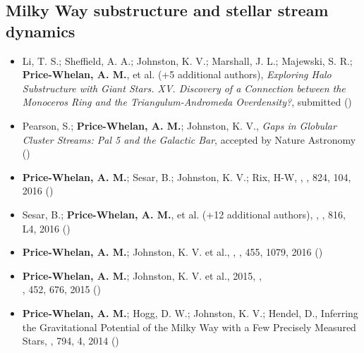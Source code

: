 \documentclass[12pt,letterpaper]{article}
\begin{document}
    \subsection*{Milky Way substructure and stellar stream dynamics}
    \begin{itemize}

\item Li, T. S.; Sheffield, A. A.; Johnston, K. V.; Marshall, J. L.; Majewski, S. R.; {\bf Price-Whelan, A. M.}, et al. (+5 additional authors),
    {\it Exploring Halo Substructure with Giant Stars. XV. Discovery of a Connection between the Monoceros Ring and the Triangulum-Andromeda Overdensity?},
    submitted ()

\item Pearson, S.; {\bf Price-Whelan, A. M.}; Johnston, K. V.,
    {\it Gaps in Globular Cluster Streams: Pal 5 and the Galactic Bar},
    accepted by Nature Astronomy ()

\item {\bf Price-Whelan, A. M.}; Sesar, B.; Johnston, K. V.; Rix, H-W,
    ,
    \apj, 824, 104, 2016 ()

\item Sesar, B.; {\bf Price-Whelan, A. M.}, et al. (+12 additional authors),
    ,
    \apjl, 816, L4, 2016 ()

\item {\bf Price-Whelan, A. M.}; Johnston, K. V. et al.,
    ,
    \mnras, 455, 1079, 2016 ()

\item {\bf Price-Whelan, A. M.}; Johnston, K. V. et al., 2015,
    ,\\
    \mnras, 452, 676, 2015 ()

\item {\bf Price-Whelan, A. M.}; Hogg, D. W.; Johnston, K. V.; Hendel, D.,
    {Inferring the Gravitational Potential of the Milky Way with a Few Precisely Measured Stars},
    \apj, 794, 4, 2014 ()

    \end{itemize}
\end{document}

